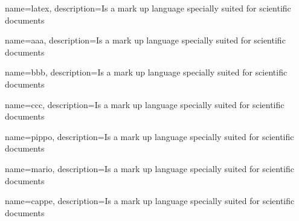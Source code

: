 {
    name=latex,
    description={Is a mark up language specially suited for scientific documents}
}

{
	name=aaa,
	description={Is a mark up language specially suited for scientific documents}
}

{
	name=bbb,
	description={Is a mark up language specially suited for scientific documents}
}

{
	name=ccc,
	description={Is a mark up language specially suited for scientific documents}
}


{
	name=pippo,
	description={Is a mark up language specially suited for scientific documents}
}

{
	name=mario,
	description={Is a mark up language specially suited for scientific documents}
}

{
	name=cappe,
	description={Is a mark up language specially suited for scientific documents}
}